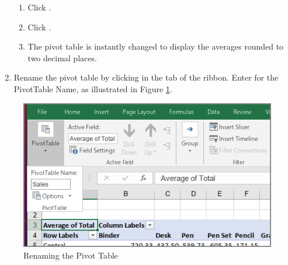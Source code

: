 \begin{enumerate}[resume]
\begin{enumerate}[resume]
		\item Click .
		\item Click .
		\item The pivot table is instantly changed to display the averages rounded to two decimal places.
	\end{enumerate}
	
	\item Rename the pivot table by clicking  in the  tab of the ribbon. Enter  for the PivotTable Name, as illustrated in Figure \ref{07:fig20}.
\end{enumerate}

\begin{figure}[H]
	\centering
	\includegraphics[width=\maxwidth{.95\linewidth}]{gfx/ch07_fig20}
	\caption{Renaming the Pivot Table}
	\label{07:fig20}
\end{figure}

